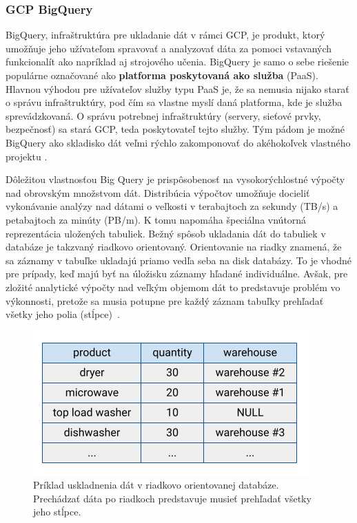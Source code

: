 \subsubsection{GCP BigQuery}
\label{big-query}

BigQuery, infraštruktúra pre ukladanie dát v rámci GCP, je produkt, ktorý umožňuje jeho užívateľom spravovať a analyzovať dáta za pomoci vstavaných funkcionalít ako napríklad aj strojového učenia.
BigQuery je samo o sebe riešenie populárne označované ako \textbf{platforma poskytovaná ako služba} (PaaS).
Hlavnou výhodou pre užívateľov služby typu PaaS je, že sa nemusia nijako starať o správu infraštruktúry, pod čím sa vlastne myslí daná platforma, kde je služba sprevádzkovaná.
O správu potrebnej infraštruktúry (servery, sieťové prvky, bezpečnosť) sa stará GCP, teda poskytovateľ tejto služby.
Tým pádom je možné BigQuery ako skladisko dát veľmi rýchlo zakomponovať do akéhokoľvek vlastného projektu \cite{google-bq}.

Dôležitou vlastnosťou Big Query je prispôsobenosť na vysokorýchlostné výpočty nad obrovským množstvom dát.
Distribúcia výpočtov umožňuje docieliť vykonávanie analýzy nad dátami o veľkosti v terabajtoch za sekundy (TB/s) a petabajtoch za minúty (PB/m).
K tomu napomáha špeciálna vnútorná reprezentácia uložených tabuliek. 
Bežný spôsob ukladania dát do tabuliek v databáze je takzvaný riadkovo orientovaný.
Orientovanie na riadky znamená, že sa záznamy v tabuľke ukladajú priamo vedľa seba na disk databázy.
To je vhodné pre prípady, keď majú byť na úložisku záznamy hľadané individuálne.
Avšak, pre zložité analytické výpočty nad veľkým objemom dát to predstavuje problém vo výkonnosti, pretože sa musia potupne pre každý záznam tabuľky prehľadať všetky jeho polia \mbox{(stĺpce) \cite{google-bq}}.

\begin{figure}[htb]
\begin{center}
 \includegraphics[scale=0.7]{obrazky-figures/row-oriented-store.png}
 \caption{\centering Príklad uskladnenia dát v riadkovo orientovanej databáze. Prechádzať dáta po riadkoch predstavuje musieť prehľadať všetky jeho stĺpce.}
 \label{img:row-oriented-store}
\end{center}
\end{figure}


